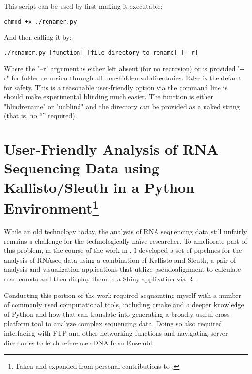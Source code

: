 This script can be used by first making it executable:

\begin{code}
\begin{verbatim}
chmod +x ./renamer.py
\end{verbatim}
\end{code}

And then calling it by:

\begin{code}
\begin{verbatim}
./renamer.py [function] [file directory to rename] [--r]
\end{verbatim}
\end{code}

Where the "--r" argument is either left absent (for no recursion) or is provided "\hyp{}\hyp{}r" for folder recursion through all non-hidden subdirectories. False is the default for safety. This is a reasonable user-friendly option via the command line is should make experimental blinding much easier. The function is either "blindrename" or "unblind" and the directory can be provided as a naked string (that is, no ``'' required).

\section[User-Friendly Analysis of RNA Sequencing Data using Kallisto/Sleuth in a Python Environment]{User-Friendly Analysis of RNA Sequencing Data using Kallisto/Sleuth in a Python Environment\footnote{Taken and expanded from personal contributions to \citet{Saelens2022}.}}\label{rnaseq}

While an old technology today, the analysis of RNA sequencing data still unfairly remains a challenge for the technologically na\"{i}ve researcher. To ameliorate part of this problem, in the course of the work in \citet{Saelens2022}, I developed a set of pipelines for the analysis of RNAseq data using a combination of Kallisto and Sleuth, a pair of analysis and visualization applications that utilize pseudoalignment to calculate read counts and then display them in a Shiny application via R \citep{Pimentel2017}.

Conducting this portion of the work required acquainting myself with a number of commonly used computational tools, including cmake and a deeper knowledge of Python and how that can translate into generating a broadly useful cross-platform tool to analyze complex sequencing data. Doing so also required interfacing with FTP and other networking functions and navigating server directories to fetch reference cDNA from Ensembl.

